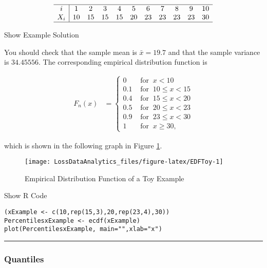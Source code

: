 \documentclass[]{book}
\theoremstyle{definition}
\theoremstyle{definition}
\theoremstyle{definition}
\theoremstyle{remark}
\begin{document}
\[\begin{array}{c|cccccccccc}
\hline
i &1&2&3&4&5&6&7&8&9&10 \\
X_i& 10 &15 &15 &15 &20 &23 &23 &23 &23 &30\\
\hline
\end{array}\]

Show Example Solution

\hypertarget{toggleExampleSelect.1.1}{}
You should check that the sample mean is \(\bar{x} = 19.7\) and that the
sample variance is \(34.45556\). The corresponding empirical
distribution function is

\[\begin{aligned}
F_n(x) &=
\left\{
\begin{array}{ll}
0 & \text{ for }\ x<10 \\
0.1 & \text{ for }\ 10 \leq x<15 \\
0.4 & \text{ for }\ 15 \leq x<20 \\
0.5 & \text{ for }\ 20 \leq x<23 \\
0.9 & \text{ for }\ 23 \leq x<30 \\
1 & \text{ for }\ x \geq 30,
\end{array}
\right.\end{aligned}\]

which is shown in the following graph in Figure \ref{fig:EDFToy}.

\begin{figure}

{\centering \texttt{[image: LossDataAnalytics\_files/figure-latex/EDFToy-1]} 

}

\caption{Empirical Distribution Function of a Toy Example}\label{fig:EDFToy}
\end{figure}

Show R Code

\hypertarget{toggleToy}{}
\begin{verbatim}
(xExample <- c(10,rep(15,3),20,rep(23,4),30))
PercentilesxExample <- ecdf(xExample)
plot(PercentilesxExample, main="",xlab="x")
\end{verbatim}

\begin{center}\rule{0.5\linewidth}{\linethickness}\end{center}

\subsubsection{Quantiles}\label{S:MS:QuantileEstimator}
\end{document}
